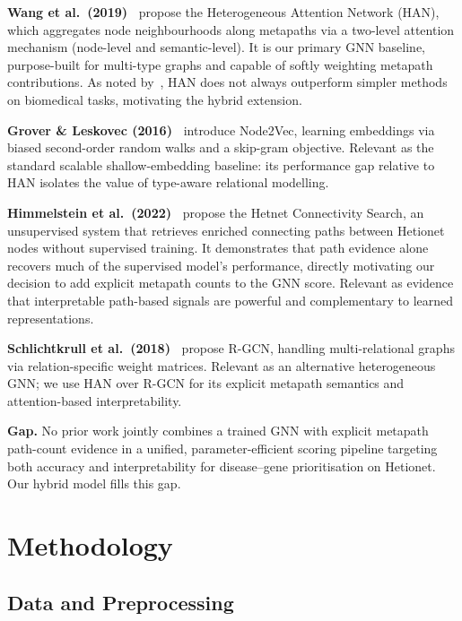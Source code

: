 \documentclass[10pt,a4paper,twocolumn]{article}
\begin{document}
\textbf{Wang et al.\ (2019)~\citep{wang2019han}} propose the Heterogeneous
Attention Network (HAN), which aggregates node neighbourhoods along metapaths
via a two-level attention mechanism (node-level and semantic-level). It is our
primary GNN baseline, purpose-built for multi-type graphs and capable of
softly weighting metapath contributions. As noted by~\citet{adnan2024benchmark},
HAN does not always outperform simpler methods on biomedical tasks, motivating
the hybrid extension.

\textbf{Grover \& Leskovec (2016)~\citep{grover2016node2vec}} introduce
Node2Vec, learning embeddings via biased second-order random walks and a
skip-gram objective. Relevant as the standard scalable shallow-embedding
baseline: its performance gap relative to HAN isolates the value of type-aware
relational modelling.

\textbf{Himmelstein et al.\ (2022)~\citep{himmelstein2022}} propose the Hetnet
Connectivity Search, an unsupervised system that retrieves enriched connecting
paths between Hetionet nodes without supervised training. It demonstrates that
path evidence alone recovers much of the supervised model's performance, directly
motivating our decision to add explicit metapath counts to the GNN score.
Relevant as evidence that interpretable path-based signals are powerful and
complementary to learned representations.

\textbf{Schlichtkrull et al.\ (2018)~\citep{schlichtkrull2018rgcn}} propose
R-GCN, handling multi-relational graphs via relation-specific weight matrices.
Relevant as an alternative heterogeneous GNN; we use HAN over R-GCN for its
explicit metapath semantics and attention-based interpretability.

\textbf{Gap.} No prior work jointly combines a trained GNN with explicit
metapath path-count evidence in a unified, parameter-efficient scoring pipeline
targeting both accuracy and interpretability for disease--gene prioritisation on
Hetionet. Our hybrid model fills this gap.

\section{Methodology}
\label{sec:methodology}

\subsection{Data and Preprocessing}
\end{document}
